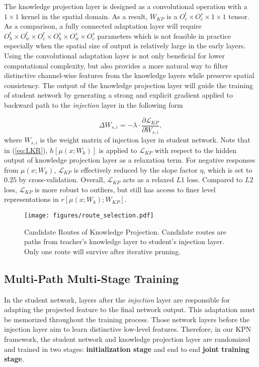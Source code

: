 \documentclass[journal]{IEEEtran}
\begin{document}
The knowledge projection layer is designed as a convolutional operation with a $1\times1$ kernel in the spatial domain. As a result, $W_{KP}$ is a $O^t_c \times O^s_c \times 1 \times 1$ tensor. As a comparison, a fully connected adaptation layer will require $O^t_h \times O^t_w \times O^t_c \times O^s_h \times O^s_w \times O^s_c$ parameters which is not feasible in practice especially when the spatial size of output is relatively large in the early layers. Using the convolutional adaptation layer is not only beneficial for lower computational complexity, but also provides a more natural way to filter distinctive channel-wise features from the knowledge layers while preserve spatial consistency. The output of the knowledge projection layer will guide the training of student network by generating a strong and explicit gradient applied to backward path to the \textit{injection} layer in the following form

\begin{equation}
\Delta {W_{s,i}} = - \lambda \cdot \frac{\partial \mathcal{L}_{KP}}{\partial W_{s,i}},
\end{equation}
where $W_{s,i}$ is the weight matrix of injection layer in student network. 
Note that in (\ref{eq:LKR}), $h[\mu(x; W_k)]$ is applied to $\mathcal{L}_{KP}$ with respect to the hidden output of knowledge projection layer as a relaxation term. For negative responses from $\mu(x; W_k)$, $\mathcal{L}_{KP}$ is effectively reduced by the slope factor $\eta$, which is set to $0.25$ by cross-validation. Overall, $\mathcal{L}_{KP}$ acts as a relaxed $L1$ loss. Compared to $L2$ loss, $\mathcal{L}_{KP}$ is more robust to outliers, but still has access to finer level representations in $r[\mu(x; W_k); W_{KP}]$. 


\begin{figure}[ht]
\begin{center}
   \texttt{[image: figures/route\_selection.pdf]}
\end{center}
   \caption{Candidate Routes of Knowledge Projection. Candidate routes are paths from teacher's knowledge layer to student's injection layer. Only one route will survive after iterative pruning.}
\label{fig:route_selection}
\end{figure}




\subsection{Multi-Path Multi-Stage Training}
In the student network, layers after the \textit{injection} layer are responsible for adapting the projected feature to the final network output. This adaptation must be memorized throughout the training process. Those network layers before the injection layer aim to learn distinctive low-level features. Therefore, in our KPN framework, the student network and knowledge projection layer are randomized and trained in two stages: \textbf{initialization stage} and end to end \textbf{joint training stage}. 
\end{document}
